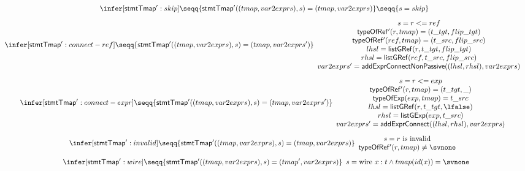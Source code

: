{%
\begin{figure}[htbp]
   \begin{gather*}
    \infer[{\sf stmtTmap'}: skip]
    {\seqq{{\sf stmtTmap'}((tmap, var2exprs), s)=(tmap, var2exprs)}}
    {\seqq{s = skip}}
   \quad
   \\[1ex]
    \infer[{\sf stmtTmap'}: connect-ref]
    {\seqq{{\sf stmtTmap'}((tmap, var2exprs), s) = (tmap, var2exprs')}}
    {
    \begin{array}{c}
      s = r <= ref \\
      {\sf typeOfRef'}(r, tmap) = (t\_tgt, flip\_tgt)  \\
      {\sf typeOfRef'}(ref, tmap) = (t\_src, flip\_src) \\ 
      lhsl = {\sf listGRef} (r, t\_tgt, flip\_tgt) \\
      rhsl = {\sf listGRef} (ref, t\_src, flip\_src) \\
      var2exprs' = {\sf addExprConnectNonPassive} ((lhsl, rhsl), var2exprs) 
     \end{array}
    }
   \quad
   \\[1ex]
    \infer[{\sf stmtTmap'}: connect-expr]
    {\seqq{{\sf stmtTmap'}((tmap, var2exprs), s) = (tmap, var2exprs')}}
    {
    \begin{array}{c}
      s = r <= exp \\
      {\sf typeOfRef'}(r, tmap) = (t\_tgt, \_)  \\
      {\sf typeOfExp}(exp, tmap) = t\_src \\ 
      lhsl = {\sf listGRef} (r, t\_tgt, \lfalse) \\
      rhsl = {\sf listGExp} (exp, t\_src)\\
      var2exprs' = {\sf addExprConnect} ((lhsl, rhsl), var2exprs)
     \end{array}
    }
   \quad
   \\[1ex]
    \infer[{\sf stmtTmap'}: invalid]
    {\seqq{{\sf stmtTmap'}((tmap, var2exprs), s) = (tmap, var2exprs)}}
    {
      \begin{array}{c}
      s = r \mbox{ is invalid} \\
      {\sf typeOfRef'}(r, tmap) \neq \svnone
     \end{array}
    }
   \quad
   \\[1ex]
    \infer[{\sf stmtTmap'}: wire]
    {\seqq{{\sf stmtTmap'}((tmap, var2exprs), s) = (tmap', var2exprs)}}
    {
      \begin{array}{c}
      s = \mbox{wire } x: t \wedge tmap(id(x)) = \svnone  \\

\end{array}}
\end{gather*}
\end{figure}}
